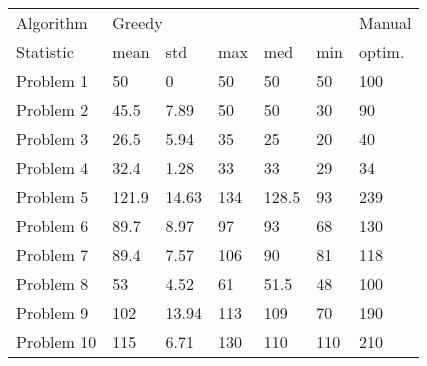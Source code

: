 \begin{tabular}{lllllll}
\toprule
Algorithm & \multicolumn{5}{l}{Greedy} & Manual \\
Statistic &   mean &    std &  max &    med &  min & optim. \\
\midrule
Problem 1  &     50 &      0 &   50 &     50 &   50 &    100 \\
Problem 2  &   45.5 &   7.89 &   50 &     50 &   30 &     90 \\
Problem 3  &   26.5 &   5.94 &   35 &     25 &   20 &     40 \\
Problem 4  &   32.4 &   1.28 &   33 &     33 &   29 &     34 \\
Problem 5  &  121.9 &  14.63 &  134 &  128.5 &   93 &    239 \\
Problem 6  &   89.7 &   8.97 &   97 &     93 &   68 &    130 \\
Problem 7  &   89.4 &   7.57 &  106 &     90 &   81 &    118 \\
Problem 8  &     53 &   4.52 &   61 &   51.5 &   48 &    100 \\
Problem 9  &    102 &  13.94 &  113 &    109 &   70 &    190 \\
Problem 10 &    115 &   6.71 &  130 &    110 &  110 &    210 \\
\bottomrule
\end{tabular}
